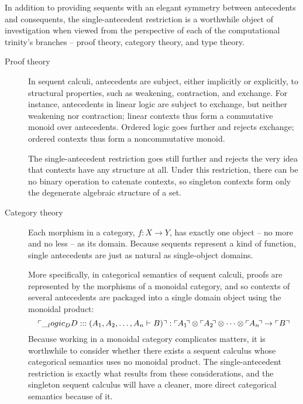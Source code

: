 In addition to providing sequents with an elegant symmetry between antecedents and consequents, the single-antecedent restriction is a worthwhile object of investigation when viewed from the perspective of each of the computational trinity's\autocite{Harper:??} branches -- proof theory, category theory, and type theory.
%
\begin{description}
\item[Proof theory]
  In sequent calculi, antecedents are subject, either implicitly or explicitly, to structural properties, such as weakening, contraction, and exchange.
  For instance, antecedents in linear logic are subject to exchange, but neither weakening nor contraction; linear contexts thus form a commutative monoid over antecedents.
  Ordered logic goes further and rejects exchange; ordered contexts thus form a noncommutative monoid.

  The single-antecedent restriction goes still further and rejects the very idea that contexts have any structure at all.
  Under this restriction, there can be no binary operation to catenate contexts, so singleton contexts form only the degenerate algebraic structure of a set.

\item[Category theory]
  Each morphism in a category, $f\colon X \rightarrow Y$, has exactly one object -- no more and no less -- as its domain.
  Because sequents represent a kind of function, single antecedents are just as natural as single-object domains.

  More specifically, in categorical semantics of sequent calculi, proofs are represented by the morphisms of a monoidal category, and so contexts of several antecedents are packaged into a single domain object using the monoidal product:
  \begin{equation*}
    \ulcorner \DD :: (A_1, A_2, \dotsc, A_n \vdash B) \urcorner :
      \ulcorner\mkern-1mu A_1 \mkern-\thinmuskip\urcorner \otimes \ulcorner\mkern-1mu A_2 \mkern-\thinmuskip\urcorner \otimes \dotsb \otimes \ulcorner\mkern-1mu A_n \mkern-\thinmuskip\urcorner \to \ulcorner B \urcorner
  \end{equation*}
  Because working in a monoidal category complicates matters, it is worthwhile to consider whether there exists a sequent calculus whose categorical semantics uses no monoidal product.
  The single-antecedent restriction is exactly what results from these considerations, and the singleton sequent calculus will have a cleaner, more direct categorical semantics because of it.


\end{description}
